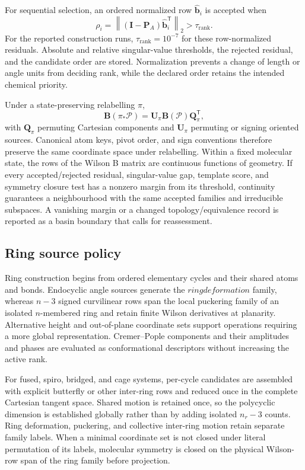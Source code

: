 \documentclass[10pt]{article}
\newcommand{\Bmat}{\mathbf{B}}
\begin{document}
For sequential selection, an ordered normalized row \(\widehat{\mathbf b}_i\)
is accepted when
\[
 \rho_i=\left\|(\mathbf I-\mathbf P_A)
              \widehat{\mathbf b}_i^{\mathsf T}\right\|_2
 >\tau_{\mathrm{rank}}.
\]
{For the reported construction runs,
\(\tau_{\mathrm{rank}}=10^{-7}\) for these row-normalized residuals.}
Absolute and relative singular-value thresholds, the rejected residual, and
the candidate order are stored.  Normalization prevents a change of length or
angle units from deciding rank, while the declared order retains the intended
chemical priority.

Under a state-preserving relabelling \(\pi\),
\[
 \Bmat(\pi_*\mathcal P)=\mathbf U_\pi\Bmat(\mathcal P)\mathbf Q_\pi^{\mathsf T},
\]
with \(\mathbf Q_\pi\) permuting Cartesian components and \(\mathbf U_\pi\)
permuting or signing oriented sources.  Canonical atom keys, pivot order, and
sign conventions therefore preserve the same coordinate space under relabelling. Within a fixed
molecular state, the {rows of the Wilson B matrix} are continuous functions of geometry.  If every
accepted/rejected residual, singular-value gap, template score, and symmetry
closure test has a nonzero margin from its threshold, continuity guarantees a
neighbourhood with the same accepted families and irreducible subspaces.  A
vanishing margin or a changed topology/equivalence record is reported as a
basin boundary that calls for reassessment.

\subsection{Ring source policy}

Ring construction begins from ordered elementary cycles and their
shared atoms and bonds.  Endocyclic angle sources generate the \(ring deformation\) family,
whereas \(n-3\) signed curvilinear rows span the local puckering family of an
isolated \(n\)-membered ring and retain finite Wilson derivatives at
planarity.  Alternative height and out-of-plane {coordinate sets} support operations
requiring a more global representation.  Cremer--Pople components and their
amplitudes and phases are evaluated as conformational descriptors without
increasing the active rank.

For fused, spiro, bridged, and cage systems, per-cycle candidates are assembled
with explicit butterfly or other inter-ring rows and reduced once in the
complete Cartesian tangent space.  Shared motion is retained once, so the
polycyclic dimension is established globally rather than by adding isolated
\(n_r-3\) counts.  Ring deformation, puckering, and collective inter-ring
motion retain separate family labels.  When a minimal {coordinate set} is not closed
under literal permutation of its labels, molecular symmetry is closed on the
physical Wilson-row span of the ring family before projection.
\end{document}
